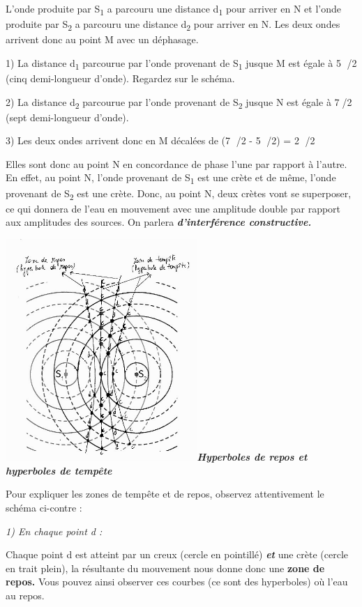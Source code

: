 L'onde produite par S\textsubscript{1} a parcouru une distance
d\textsubscript{1} pour arriver en N et l'onde produite par
S\textsubscript{2} a parcouru une distance d\textsubscript{2} pour
arriver en N. Les deux ondes arrivent donc au point M avec un déphasage.

1) La distance d\textsubscript{1} parcourue par l'onde provenant de
S\textsubscript{1} jusque M est égale à 5 /2 (cinq demi-longueur
d'onde). Regardez sur le schéma.

2) La distance d\textsubscript{2} parcourue par l'onde provenant de
S\textsubscript{2} jusque N est égale à 7/2 (sept demi-longueur
d'onde).

3) Les deux ondes arrivent donc en M décalées de (7 /2 - 5 /2) = 2 /2

Elles sont donc au point N en concordance de phase l'une par rapport à
l'autre. En effet, au point N, l'onde provenant de S\textsubscript{1}
est une crète et de même, l'onde provenant de S\textsubscript{2} est une
crète. Donc, au point N, deux crètes vont se superposer, ce qui donnera
de l'eau en mouvement avec une amplitude double par rapport aux
amplitudes des sources. On parlera \emph{\textbf{d'interférence
constructive.}}

\emph{\textbf{ }}

\includegraphics[width=7.264cm,height=8.423cm]{Pictures/100000010000021B000002719784CD0CAF081F55.png}\emph{\textbf{Hyperboles
de repos et hyperboles de tempête}}

Pour expliquer les zones de tempête et de repos, observez attentivement
le schéma ci-contre :

\emph{1) En chaque point d :}

Chaque point d est atteint par un creux (cercle en pointillé)
\emph{\textbf{et}} une crète (cercle en trait plein), la résultante du
mouvement nous donne donc une \textbf{zone de repos.} Vous pouvez ainsi
observer ces courbes (ce sont des hyperboles) où l'eau au repos.

